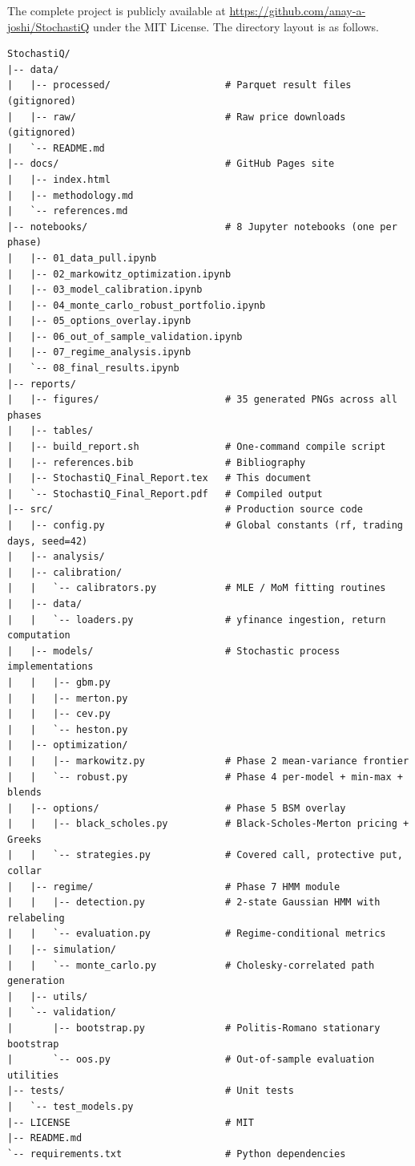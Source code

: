 \documentclass[11pt,letterpaper]{article}
\begin{document}
The complete project is publicly available at \url{https://github.com/anay-a-joshi/StochastiQ} under the MIT License. The directory layout is as follows.

\begin{lstlisting}[basicstyle=\small\ttfamily,frame=none]
StochastiQ/
|-- data/
|   |-- processed/                    # Parquet result files (gitignored)
|   |-- raw/                          # Raw price downloads (gitignored)
|   `-- README.md
|-- docs/                             # GitHub Pages site
|   |-- index.html
|   |-- methodology.md
|   `-- references.md
|-- notebooks/                        # 8 Jupyter notebooks (one per phase)
|   |-- 01_data_pull.ipynb
|   |-- 02_markowitz_optimization.ipynb
|   |-- 03_model_calibration.ipynb
|   |-- 04_monte_carlo_robust_portfolio.ipynb
|   |-- 05_options_overlay.ipynb
|   |-- 06_out_of_sample_validation.ipynb
|   |-- 07_regime_analysis.ipynb
|   `-- 08_final_results.ipynb
|-- reports/
|   |-- figures/                      # 35 generated PNGs across all phases
|   |-- tables/
|   |-- build_report.sh               # One-command compile script
|   |-- references.bib                # Bibliography
|   |-- StochastiQ_Final_Report.tex   # This document
|   `-- StochastiQ_Final_Report.pdf   # Compiled output
|-- src/                              # Production source code
|   |-- config.py                     # Global constants (rf, trading days, seed=42)
|   |-- analysis/
|   |-- calibration/
|   |   `-- calibrators.py            # MLE / MoM fitting routines
|   |-- data/
|   |   `-- loaders.py                # yfinance ingestion, return computation
|   |-- models/                       # Stochastic process implementations
|   |   |-- gbm.py
|   |   |-- merton.py
|   |   |-- cev.py
|   |   `-- heston.py
|   |-- optimization/
|   |   |-- markowitz.py              # Phase 2 mean-variance frontier
|   |   `-- robust.py                 # Phase 4 per-model + min-max + blends
|   |-- options/                      # Phase 5 BSM overlay
|   |   |-- black_scholes.py          # Black-Scholes-Merton pricing + Greeks
|   |   `-- strategies.py             # Covered call, protective put, collar
|   |-- regime/                       # Phase 7 HMM module
|   |   |-- detection.py              # 2-state Gaussian HMM with relabeling
|   |   `-- evaluation.py             # Regime-conditional metrics
|   |-- simulation/
|   |   `-- monte_carlo.py            # Cholesky-correlated path generation
|   |-- utils/
|   `-- validation/
|       |-- bootstrap.py              # Politis-Romano stationary bootstrap
|       `-- oos.py                    # Out-of-sample evaluation utilities
|-- tests/                            # Unit tests
|   `-- test_models.py
|-- LICENSE                           # MIT
|-- README.md
`-- requirements.txt                  # Python dependencies
\end{lstlisting}
\end{document}
